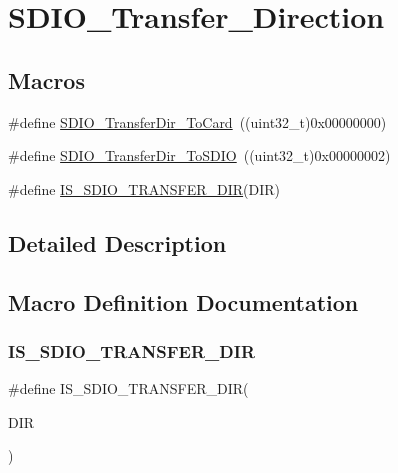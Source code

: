 \hypertarget{group___s_d_i_o___transfer___direction}{}\section{S\+D\+I\+O\+\_\+\+Transfer\+\_\+\+Direction}
\label{group___s_d_i_o___transfer___direction}
\subsection*{Macros}
\begin{DoxyCompactItemize}
\item 
\#define \mbox{\hyperlink{group___s_d_i_o___transfer___direction_gaef8af0ffa4ea04b3362338d268cc0935}{S\+D\+I\+O\+\_\+\+Transfer\+Dir\+\_\+\+To\+Card}}~((uint32\+\_\+t)0x00000000)
\item 
\#define \mbox{\hyperlink{group___s_d_i_o___transfer___direction_ga55a6d9613d3e2e7762296b45d0d13222}{S\+D\+I\+O\+\_\+\+Transfer\+Dir\+\_\+\+To\+S\+D\+IO}}~((uint32\+\_\+t)0x00000002)
\item 
\#define \mbox{\hyperlink{group___s_d_i_o___transfer___direction_gaf84b8004cfef6a5a525b20db8a83c2f7}{I\+S\+\_\+\+S\+D\+I\+O\+\_\+\+T\+R\+A\+N\+S\+F\+E\+R\+\_\+\+D\+IR}}(D\+IR)
\end{DoxyCompactItemize}


\subsection{Detailed Description}


\subsection{Macro Definition Documentation}
\mbox{\label{group___s_d_i_o___transfer___direction_gaf84b8004cfef6a5a525b20db8a83c2f7}} 
\subsubsection{\texorpdfstring{IS\_SDIO\_TRANSFER\_DIR}{IS\_SDIO\_TRANSFER\_DIR}}
{\footnotesize\ttfamily \#define I\+S\+\_\+\+S\+D\+I\+O\+\_\+\+T\+R\+A\+N\+S\+F\+E\+R\+\_\+\+D\+IR(\begin{DoxyParamCaption}\item[{}]{D\+IR }\end{DoxyParamCaption})}

